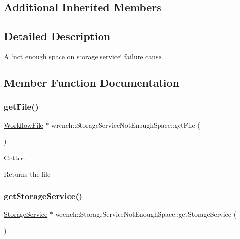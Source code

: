 \subsection*{Additional Inherited Members}


\subsection{Detailed Description}
A \char`\"{}not enough space on storage service\char`\"{} failure cause. 

\subsection{Member Function Documentation}
\mbox{\label{classwrench_1_1_storage_service_not_enough_space_a57d85bc5ed469118d3cb235270fffb3e}} 
\subsubsection{\texorpdfstring{get\+File()}{getFile()}}
{\footnotesize\ttfamily \hyperlink{classwrench_1_1_workflow_file}{Workflow\+File} $\ast$ wrench\+::\+Storage\+Service\+Not\+Enough\+Space\+::get\+File (\begin{DoxyParamCaption}{ }\end{DoxyParamCaption})}



Getter. 

\begin{DoxyReturn}{Returns}
the file 
\end{DoxyReturn}
\mbox{\label{classwrench_1_1_storage_service_not_enough_space_a1c480ac68fe40aadd348999d1069c5d0}} 
\subsubsection{\texorpdfstring{get\+Storage\+Service()}{getStorageService()}}
{\footnotesize\ttfamily \hyperlink{classwrench_1_1_storage_service}{Storage\+Service} $\ast$ wrench\+::\+Storage\+Service\+Not\+Enough\+Space\+::get\+Storage\+Service (\begin{DoxyParamCaption}{ }\end{DoxyParamCaption})}



